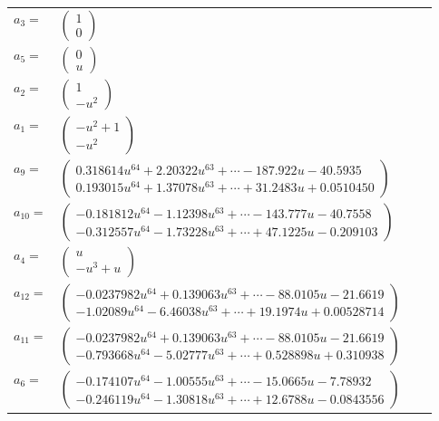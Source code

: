 \documentclass[1p]{elsarticle_modified}
\theoremstyle{definition}
\begin{document}
\begin{tabular}{m{7pt} m{180pt} m{7pt} m{180pt} }
\flushright $a_{3}=$&$\begin{pmatrix}1\\0\end{pmatrix}$ \\
\flushright $a_{5}=$&$\begin{pmatrix}0\\u\end{pmatrix}$ \\
\flushright $a_{2}=$&$\begin{pmatrix}1\\- u^2\end{pmatrix}$ \\
\flushright $a_{1}=$&$\begin{pmatrix}- u^2+1\\- u^2\end{pmatrix}$ \\
\flushright $a_{9}=$&$\begin{pmatrix}0.318614 u^{64}+2.20322 u^{63}+\cdots-187.922 u-40.5935\\0.193015 u^{64}+1.37078 u^{63}+\cdots+31.2483 u+0.0510450\end{pmatrix}$ \\
\flushright $a_{10}=$&$\begin{pmatrix}-0.181812 u^{64}-1.12398 u^{63}+\cdots-143.777 u-40.7558\\-0.312557 u^{64}-1.73228 u^{63}+\cdots+47.1225 u-0.209103\end{pmatrix}$ \\
\flushright $a_{4}=$&$\begin{pmatrix}u\\- u^3+u\end{pmatrix}$ \\
\flushright $a_{12}=$&$\begin{pmatrix}-0.0237982 u^{64}+0.139063 u^{63}+\cdots-88.0105 u-21.6619\\-1.02089 u^{64}-6.46038 u^{63}+\cdots+19.1974 u+0.00528714\end{pmatrix}$ \\
\flushright $a_{11}=$&$\begin{pmatrix}-0.0237982 u^{64}+0.139063 u^{63}+\cdots-88.0105 u-21.6619\\-0.793668 u^{64}-5.02777 u^{63}+\cdots+0.528898 u+0.310938\end{pmatrix}$ \\
\flushright $a_{6}=$&$\begin{pmatrix}-0.174107 u^{64}-1.00555 u^{63}+\cdots-15.0665 u-7.78932\\-0.246119 u^{64}-1.30818 u^{63}+\cdots+12.6788 u-0.0843556\end{pmatrix}$ \\

\end{tabular}
\end{document}
